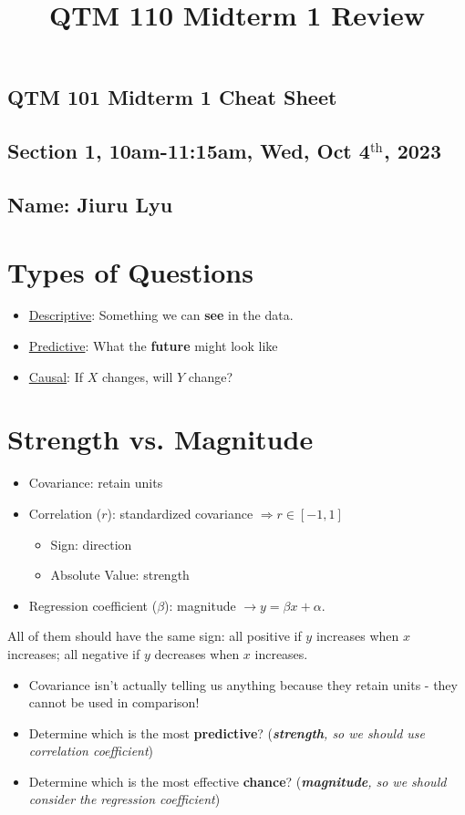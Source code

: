 \documentclass[10pt, letterpaper]{article}
\title{\textbf{QTM 110 Midterm 1 Review}}
\begin{document}
\newpage
\begin{multicols}{2}
\thispagestyle{plain}

\subsection*{QTM 101 Midterm 1 Cheat Sheet}
\subsection*{Section 1, 10am-11:15am, Wed, Oct 4$^\text{th}$, 2023}
\subsection*{Name: Jiuru Lyu}

\section*{Types of Questions}
\begin{itemize}
	\item \underline{Descriptive}: Something we can \textbf{see} in the data.
	\item \underline{Predictive}: What the \textbf{future} might look like
	\item \underline{Causal}: If $X$ changes, will $Y$ change? 
\end{itemize}

\section*{Strength vs. Magnitude}
\begin{itemize}
	\item Covariance: retain units
	\item Correlation ($r$): standardized covariance $\Rightarrow r\in[-1,1]$
	\begin{itemize}
		\item Sign: direction
		\item Absolute Value: strength
	\end{itemize}
	\item Regression coefficient ($\beta$): magnitude $\rightarrow y=\beta x+\alpha$.
\end{itemize}
All of them should have the same sign: all positive if $y$ increases when $x$ increases; all negative if $y$ decreases when $x$ increases. 
\begin{itemize}
	\item Covariance isn't actually telling us anything because they retain units - they cannot be used in comparison! 
	\item Determine which is the most \textbf{predictive}? (\textit{\textbf{strength}, so we should use correlation coefficient})
	\item Determine which is the most effective \textbf{chance}? (\textit{\textbf{magnitude}, so we should consider the regression coefficient})
\end{itemize}


\end{multicols}
\end{document}
